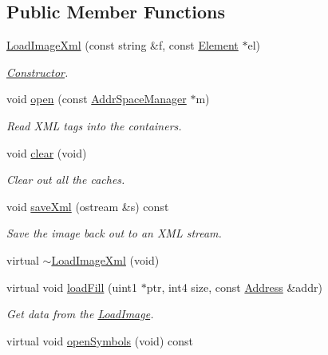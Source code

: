 \subsection*{Public Member Functions}
\begin{DoxyCompactItemize}
\item 
\mbox{\hyperlink{class_load_image_xml_a8400e67a31d8217d0ac08fe7b9c61d86}{Load\+Image\+Xml}} (const string \&f, const \mbox{\hyperlink{class_element}{Element}} $\ast$el)
\begin{DoxyCompactList}\small\item\em \mbox{\hyperlink{class_constructor}{Constructor}}. \end{DoxyCompactList}\item 
void \mbox{\hyperlink{class_load_image_xml_a927feb1545848f92d69e4729c92c7400}{open}} (const \mbox{\hyperlink{class_addr_space_manager}{Addr\+Space\+Manager}} $\ast$m)
\begin{DoxyCompactList}\small\item\em Read X\+ML tags into the containers. \end{DoxyCompactList}\item 
void \mbox{\hyperlink{class_load_image_xml_a609c3c7c8ae8d9a4152ceb83aad0e862}{clear}} (void)
\begin{DoxyCompactList}\small\item\em Clear out all the caches. \end{DoxyCompactList}\item 
void \mbox{\hyperlink{class_load_image_xml_a299156268ffc721a01871095d1d93a73}{save\+Xml}} (ostream \&s) const
\begin{DoxyCompactList}\small\item\em Save the image back out to an X\+ML stream. \end{DoxyCompactList}\item 
virtual \mbox{\hyperlink{class_load_image_xml_ab6988ec5d5f59f559db6eeac141e4e73}{$\sim$\+Load\+Image\+Xml}} (void)
\item 
virtual void \mbox{\hyperlink{class_load_image_xml_a39ab20b5642df7cf4b84d312a48b1d17}{load\+Fill}} (uint1 $\ast$ptr, int4 size, const \mbox{\hyperlink{class_address}{Address}} \&addr)
\begin{DoxyCompactList}\small\item\em Get data from the \mbox{\hyperlink{class_load_image}{Load\+Image}}. \end{DoxyCompactList}\item 
virtual void \mbox{\hyperlink{class_load_image_xml_abf281fd9e155951f168ddab099dadf47}{open\+Symbols}} (void) const

\end{DoxyCompactItemize}

